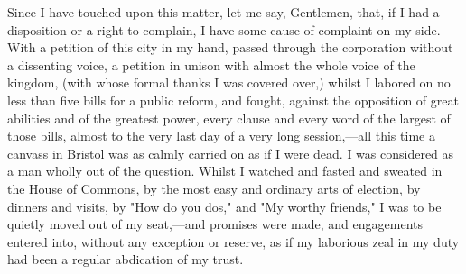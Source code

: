 Since I have touched upon this matter, let me say, Gentlemen, that, if I had a disposition or a right to complain, I have some cause of complaint on my side. With a petition of this city in my hand, passed through the corporation without a dissenting voice, a petition in unison with almost the whole voice of the kingdom, (with whose formal thanks I was covered over,) whilst I labored on no less than five bills for a public reform, and fought, against the opposition of great abilities and of the greatest power, every clause and every word of the largest of those bills, almost to the very last day of a very long session,—all this time a canvass in Bristol was as calmly carried on as if I were dead. I was considered as a man wholly out of the question. Whilst I watched and fasted and sweated in the House of Commons, by the most easy and ordinary arts of election, by dinners and visits, by "How do you dos," and "My worthy friends," I was to be quietly moved out of my seat,—and promises were made, and engagements entered into, without any exception or reserve, as if my laborious zeal in my duty had been a regular abdication of my trust.

